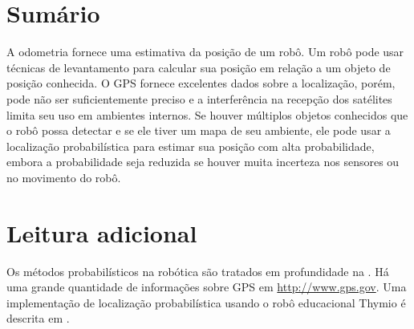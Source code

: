\section{Sumário}

A odometria fornece uma estimativa da posição de um robô. Um robô pode usar técnicas de levantamento para calcular sua posição em relação a um objeto de posição conhecida. O GPS fornece excelentes dados sobre a localização, porém, pode não ser suficientemente preciso e a interferência na recepção dos satélites limita seu uso em ambientes internos. Se houver múltiplos objetos conhecidos que o robô possa detectar e se ele tiver um mapa de seu ambiente, ele pode usar a localização probabilística para estimar sua posição com alta probabilidade, embora a probabilidade seja reduzida se houver muita incerteza nos sensores ou no movimento do robô.

\section{Leitura adicional}

Os métodos probabilísticos na robótica são tratados em profundidade na  \cite{thrun}. Há uma grande quantidade de informações sobre GPS em \url{http://www.gps.gov}. Uma implementação de localização probabilística usando o robô educacional Thymio é descrita em \cite{wang2016dars}.
